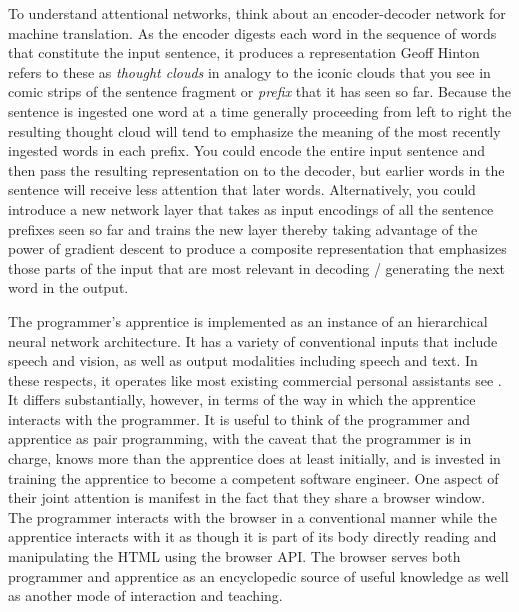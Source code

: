 To understand attentional networks, think about an encoder-decoder network for machine translation. As the encoder digests each word in the sequence of words that constitute the input sentence, it produces a representation \emdash{} Geoff Hinton refers to these as {\it{thought clouds}} in analogy to the iconic clouds that you see in comic strips \emdash{} of the sentence fragment or {\it{prefix}} that it has seen so far. Because the sentence is ingested one word at a time \emdash{} generally proceeding from left to right \emdash{} the resulting thought cloud will tend to emphasize the meaning of the most recently ingested words in each prefix. You could encode the entire input sentence and then pass the resulting representation on to the decoder, but earlier words in the sentence will receive less attention that later words. Alternatively, you could introduce a new network layer that takes as input encodings of all the sentence prefixes seen so far and trains the new layer \emdash{} thereby taking advantage of the power of gradient descent \emdash{} to produce a composite representation that emphasizes those parts of the input that are most relevant in decoding / generating the next word in the output.

The programmer's apprentice is implemented as an instance of an hierarchical neural network architecture. It has a variety of conventional inputs that include speech and vision, as well as output modalities including speech and text. In these respects, it operates like most existing commercial personal assistants \emdash{} see {{}}. It differs substantially, however, in terms of the way in which the apprentice interacts with the programmer. It is useful to think of the programmer and apprentice as pair programming, with the caveat that the programmer is in charge, knows more than the apprentice does \emdash{} at least initially, and is invested in training the apprentice to become a competent software engineer. One aspect of their joint attention is manifest in the fact that they share a browser window. The programmer interacts with the browser in a conventional manner while the apprentice interacts with it as though it is part of its body directly reading and manipulating the HTML using the browser API. The browser serves both programmer and apprentice as an encyclopedic source of useful knowledge as well as another mode of interaction and teaching.

